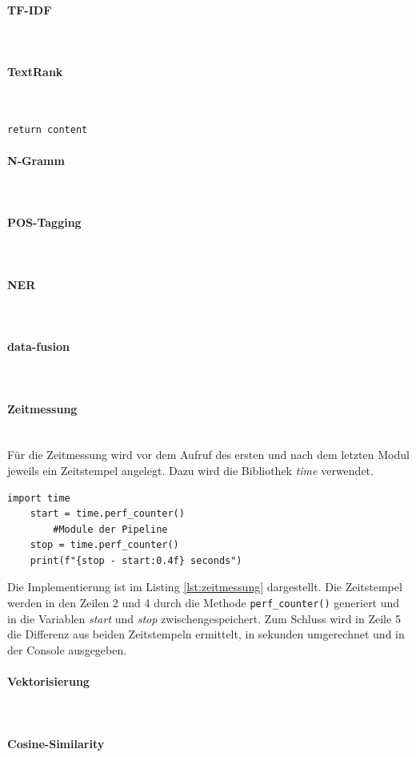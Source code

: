 \paragraph{TF-IDF}\mbox{}\\

\paragraph{TextRank}\mbox{}\\
\begin{lstlisting}[caption={Implementation des Moduls \emph{textRankingAlgorithm.py}}, label=lst:textrank]
	return content
\end{lstlisting}

\paragraph{N-Gramm}\mbox{}\\

\paragraph{POS-Tagging}\mbox{}\\

\paragraph{NER}\mbox{}\\

\paragraph{data-fusion}\mbox{}\\

\paragraph{Zeitmessung}\mbox{}\\
Für die Zeitmessung wird vor dem Aufruf des ersten und nach dem letzten Modul jeweils ein Zeitstempel angelegt. Dazu wird die Bibliothek \emph{time} verwendet.
\begin{lstlisting}[caption={Implementation der Zeitmessung}, label=lst:zeitmessung]
	import time
	start = time.perf_counter()
		#Module der Pipeline
	stop = time.perf_counter()
	print(f"{stop - start:0.4f} seconds")
\end{lstlisting}
Die Implementierung ist im Listing \ref{lst:zeitmessung} dargestellt. Die Zeitstempel werden in den Zeilen 2 und 4 durch die Methode \lstinline{perf_counter()}
generiert und in die Variablen \emph{start} und \emph{stop} zwischengespeichert. Zum Schluss wird in Zeile 5 die Differenz aus beiden Zeitstempeln ermittelt, in sekunden umgerechnet und in der Console ausgegeben.
\paragraph{Vektorisierung}\mbox{}\\

\paragraph{Cosine-Similarity}\mbox{}\\